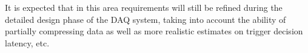 It is expected that in this area requirements will still be refined during the detailed design phase of the DAQ system, taking into account the ability of partially compressing data as well as more realistic estimates on trigger decision latency, etc.








